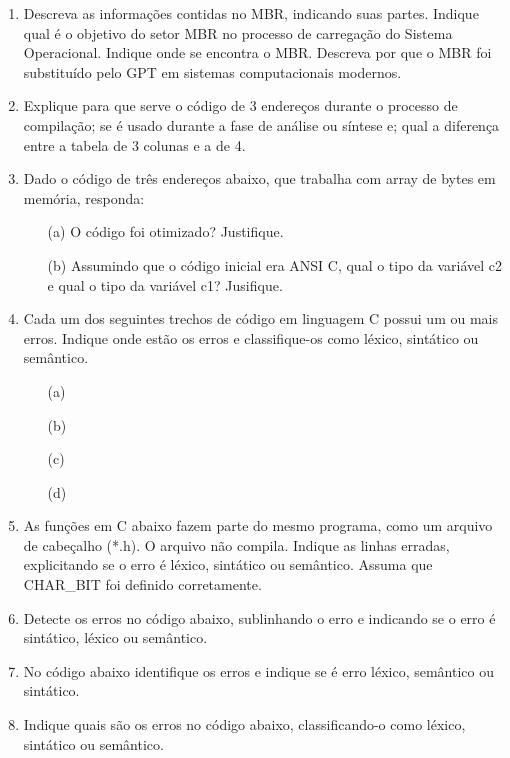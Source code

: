 \begin{enumerate}
    \item
    Descreva as informações contidas no MBR, indicando suas partes.
    Indique qual é o objetivo do setor MBR no processo de carregação do Sistema Operacional.
    Indique onde se encontra o MBR.
    Descreva por que o MBR foi substituído pelo GPT 
    em sistemas computacionais modernos.

    \item
    Explique para que serve o código de 3 endereços
    durante o processo de compilação;
    se é usado durante a fase de análise ou síntese e;
    qual a diferença entre a tabela de 3 colunas e a de 4.

    \item
    Dado o código de três endereços abaixo, 
    que trabalha com array de bytes em memória,
    responda:    

    \begin{itemize}
        \item [(a)]
        O código foi otimizado? Justifique.
        
        \item [(b)]
        Assumindo que o código inicial era ANSI C, 
        qual o tipo da variável c2 e
        qual o tipo da variável c1? Jusifique.         
    \end{itemize}

    \item
    Cada um dos seguintes trechos de código em linguagem C 
    possui um ou mais erros. Indique onde estão os erros 
    e classifique-os como léxico, sintático ou semântico.
    \begin{itemize}
        \item [(a)] 
        \item [(b)] 
        \item [(c)] 
        \item [(d)] 
    \end{itemize}

    \item
    As funções em C abaixo fazem parte do mesmo programa,
    como um arquivo de cabeçalho (*.h). O arquivo não compila.
    Indique as linhas erradas, explicitando se o erro é
    léxico, sintático ou semântico.
    Assuma que CHAR\_BIT foi definido corretamente.

    \item
    Detecte os erros no código abaixo, sublinhando o erro
    e indicando se o erro é sintático, léxico ou semântico.

    \item
    No código abaixo identifique os erros
    e indique se é erro léxico, semântico ou sintático.

    \item
    Indique quais são os erros no código abaixo, classificando-o como
    léxico, sintático ou semântico.

\end{enumerate}
